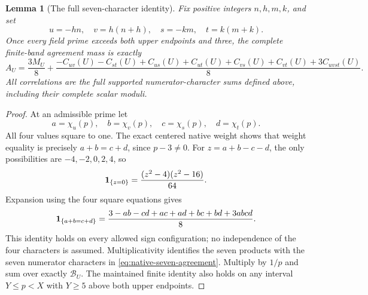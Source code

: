 \documentclass[11pt]{article}
\newtheorem{lemma}[theorem]{Lemma}
\begin{document}
\begin{lemma}[The full seven-character identity]
\label{lem:native-seven-agreement}
Fix positive integers \(n,h,m,k\), and set
\[
 u=-hn,\quad v=h(n+h),\quad s=-km,\quad t=k(m+k).
\]
Once every field prime exceeds both upper endpoints and three,
the complete finite-band agreement mass is exactly
\begin{equation}\label{eq:native-seven-agreement}
 A_U=\frac{3M_U}{8}
 +\frac{-C_{uv}(U)-C_{st}(U)+C_{us}(U)+C_{ut}(U)
                 +C_{vs}(U)+C_{vt}(U)+3C_{uvst}(U)}8.
\end{equation}
All correlations are the full supported numerator-character sums
defined above, including their complete scalar moduli.
\end{lemma}
\begin{proof}
At an admissible prime let
\[
 a=\chi_u(p),\quad b=\chi_v(p),\quad
 c=\chi_s(p),\quad d=\chi_t(p).
\]
All four values square to one. The exact centered native weight
shows that weight equality is precisely \(a+b=c+d\), since
\(p-3\ne0\). For \(z=a+b-c-d\), the only possibilities are
\(-4,-2,0,2,4\), so
\[
 {\bf1}_{\{z=0\}}=\frac{(z^2-4)(z^2-16)}{64}.
\]
Expansion using the four square equations gives
\[
 {\bf1}_{\{a+b=c+d\}}
       =\frac{3-ab-cd+ac+ad+bc+bd+3abcd}{8}.
\]
This identity holds on every allowed sign configuration; no
independence of the four characters is assumed. Multiplicativity
identifies the seven products with the seven numerator characters
in \eqref{eq:native-seven-agreement}. Multiply by \(1/p\) and sum
over exactly \(\mathcal B_U\). The maintained finite identity also
holds on any interval \(Y\le p<X\) with \(Y\ge5\) above both
upper endpoints.
\end{proof}
\end{document}

